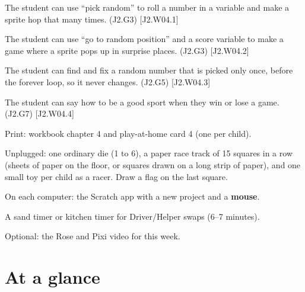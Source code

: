 
\begin{objectives}
  \item The student can use \enquote{pick random} to roll a number in a variable and make a sprite hop that many times. (J2.G3) [J2.W04.1]
  \item The student can use \enquote{go to random position} and a score variable to make a game where a sprite pops up in surprise places. (J2.G3) [J2.W04.2]
  \item The student can find and fix a random number that is picked only once, before the forever loop, so it never changes. (J2.G5) [J2.W04.3]
  \item The student can say how to be a good sport when they win or lose a game. (J2.G7) [J2.W04.4]
\end{objectives}

\begin{materials}
  \item Print: workbook chapter 4 and play-at-home card 4 (one per child).
  \item Unplugged: one ordinary die (1 to 6), a paper race track of 15 squares in a row (sheets of paper on the floor, or squares drawn on a long strip of paper), and one small toy per child as a racer. Draw a flag on the last square.
  \item On each computer: the Scratch app with a new project and a \textbf{mouse}.
  \item A sand timer or kitchen timer for Driver/Helper swaps (6--7 minutes).
  \item Optional: the Rose and Pixi video for this week.
\end{materials}

\section{At a glance}
\begin{timeplan}
\end{timeplan}

